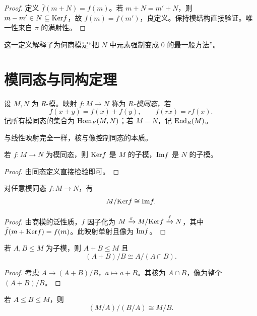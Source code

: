 \begin{proof}
定义 $\bar f(m+N)=f(m)$。若 $m+N=m'+N$，则 $m-m'\in N\subseteq \mathrm{Ker} f$，故 $f(m)=f(m')$，良定义。保持模结构直接验证。唯一性来自 $\pi$ 的满射性。
\end{proof}

\begin{remark}
这一定义解释了为何商模是“把 $N$ 中元素强制变成 $0$ 的最一般方法”。
\end{remark}

\section{模同态与同构定理}

\begin{definition}
设 $M,N$ 为 $R$-模。映射 $f:M\to N$ 称为 \emph{$R$-模同态}，若
\[
 f(x+y)=f(x)+f(y),\qquad f(rx)=rf(x).
\]
记所有模同态的集合为 $\mathrm{Hom}_R(M,N)$；若 $M=N$，记 $\mathrm{End}_R(M)$。
\end{definition}

与线性映射完全一样，核与像控制同态的本质。

\begin{proposition}
若 $f:M\to N$ 为模同态，则 $\mathrm{Ker} f$ 是 $M$ 的子模，$\mathrm{Im} f$ 是 $N$ 的子模。
\end{proposition}

\begin{proof}
由同态定义直接检验即可。
\end{proof}

\begin{theorem}[第一同构定理]
对任意模同态 $f:M\to N$，有
\[
 M/\mathrm{Ker} f\cong \mathrm{Im} f.
\]
\end{theorem}

\begin{proof}
由商模的泛性质，$f$ 因子化为 $M\xrightarrow{\pi} M/\mathrm{Ker} f\xrightarrow{\tilde f}N$，其中 $\tilde f(m+\mathrm{Ker} f)=f(m)$。此映射单射且像为 $\mathrm{Im} f$。
\end{proof}

\begin{theorem}[第二同构定理]
若 $A,B\le M$ 为子模，则 $A+B\le M$ 且
\[
 (A+B)/B\cong A/(A\cap B).
\]
\end{theorem}

\begin{proof}
考虑 $A\to (A+B)/B$，$a\mapsto a+B$。其核为 $A\cap B$，像为整个 $(A+B)/B$。
\end{proof}

\begin{theorem}[第三同构定理]
若 $A\le B\le M$，则
\[
 (M/A)/(B/A)\cong M/B.
\]
\end{theorem}

